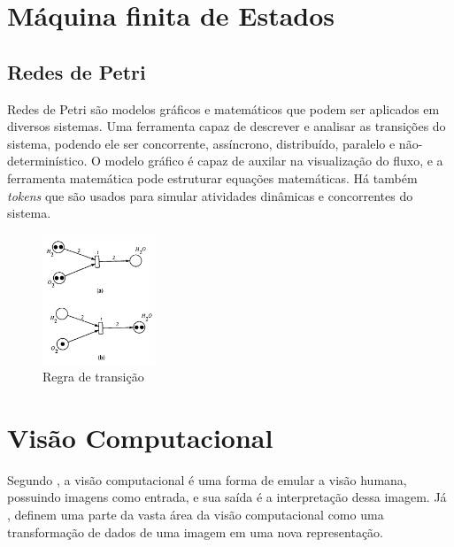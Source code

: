 \section{Máquina finita de Estados}


\subsection{Redes de Petri}
Redes de Petri são modelos gráficos e matemáticos que podem ser aplicados em diversos sistemas. Uma ferramenta capaz de descrever e analisar as transições do sistema, podendo ele ser concorrente, assíncrono, distribuído, paralelo e não-determinístico. O modelo gráfico é capaz de auxilar na visualização do fluxo, e a ferramenta matemática pode estruturar equações matemáticas. Há também \textit{tokens} que são usados para simular atividades dinâmicas e concorrentes do sistema. \cite{murata:1989}
 
 \begin{figure}[H]
	\centering
    	\caption{\label{fig:petri}Regra de transição}
		\includegraphics[width = 0.3\textwidth]	{resources/petri}
\end{figure}


\section{Visão Computacional}
Segundo , a visão computacional é uma forma de emular a visão humana, possuindo imagens como entrada, e sua saída é a interpretação dessa imagem.
Já , definem uma parte da vasta área da visão computacional como uma transformação de dados de uma imagem em uma nova representação.

